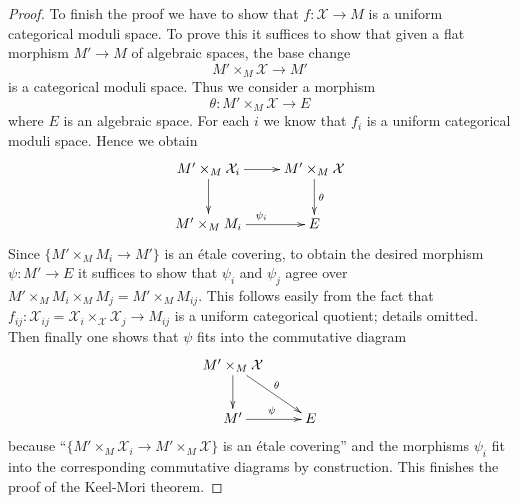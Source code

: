 \documentclass[10pt,a4paper]{amsart}
\theoremstyle{plain}
\theoremstyle{definition}
\theoremstyle{remark}
\numberwithin{equation}{subsection}
\begin{document}
\begin{proof}
\medskip\noindent
To finish the proof we have to show that $f : \mathcal{X} \to M$
is a uniform categorical moduli space.
To prove this it suffices to show that given a flat morphism
$M' \to M$ of algebraic spaces, the base change
$$
M' \times_M \mathcal{X} \longrightarrow M'
$$
is a categorical moduli space. Thus we consider a morphism
$$
\theta : M' \times_M \mathcal{X} \longrightarrow E
$$
where $E$ is an algebraic space. For each $i$ we know that
$f_i$ is a uniform categorical moduli space. Hence we obtain
$$
\xymatrix{
M' \times_M \mathcal{X}_i \ar[d] \ar[r] &
M' \times_M \mathcal{X} \ar[d]^\theta \\
M' \times_M M_i \ar[r]^{\psi_i} &
E
}
$$
Since $\{M' \times_M M_i \to M'\}$ is an \'etale covering,
to obtain the desired morphism $\psi : M' \to E$ it suffices
to show that $\psi_i$ and $\psi_j$ agree over
$M' \times_M M_i \times_M M_j = M' \times_M M_{ij}$.
This follows easily from the fact that
$f_{ij} : \mathcal{X}_{ij} =
\mathcal{X}_i \times_\mathcal{X} \mathcal{X}_j \to M_{ij}$ is a uniform
categorical quotient; details omitted.
Then finally one shows that $\psi$ fits into the commutative diagram
$$
\xymatrix{
M' \times_M \mathcal{X} \ar[d] \ar[rd]^\theta \\
M' \ar[r]^\psi &
E
}
$$
because ``$\{M' \times_M \mathcal{X}_i \to M' \times_M \mathcal{X}\}$
is an \'etale covering'' and the morphisms $\psi_i$ fit into the
corresponding commutative diagrams by construction.
This finishes the proof of the Keel-Mori theorem.
\end{proof}
\end{document}
